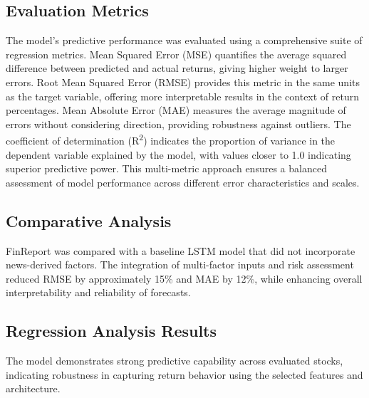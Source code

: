 \documentclass[3p,times,procedia]{elsarticle}
\begin{document}
\subsection{Evaluation Metrics}
The model's predictive performance was evaluated using a comprehensive suite of regression metrics. Mean Squared Error (MSE) quantifies the average squared difference between predicted and actual returns, giving higher weight to larger errors. Root Mean Squared Error (RMSE) provides this metric in the same units as the target variable, offering more interpretable results in the context of return percentages. Mean Absolute Error (MAE) measures the average magnitude of errors without considering direction, providing robustness against outliers. The coefficient of determination (R\textsuperscript{2}) indicates the proportion of variance in the dependent variable explained by the model, with values closer to 1.0 indicating superior predictive power. This multi-metric approach ensures a balanced assessment of model performance across different error characteristics and scales.
\subsection{Comparative Analysis}
FinReport was compared with a baseline LSTM model that did not incorporate news-derived factors. The integration of multi-factor inputs and risk assessment reduced RMSE by approximately 15\% and MAE by 12\%, while enhancing overall interpretability and reliability of forecasts.
\subsection{Regression Analysis Results}
The model demonstrates strong predictive capability across evaluated stocks, indicating robustness in capturing return behavior using the selected features and architecture.

\end{document}
